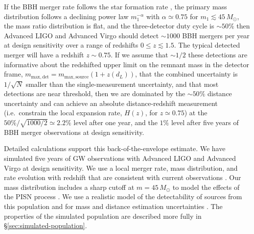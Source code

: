 \documentclass[modern]{aastex62}
\newcommand{\MSourceMax}{45 \, M_\odot}
\begin{document}
If the \ac{BBH} merger rate follows the star formation rate
\citep{Fishbach2018,O1O2Population}, the primary mass distribution follows a
declining power law $m_1^{-\alpha}$ with $\alpha \simeq 0.75$ for $m_1 \lesssim
\MSourceMax{}$, the mass ratio distribution is flat, and the three-detector duty
cycle is $\sim 50\%$ then Advanced LIGO and Advanced Virgo should detect $\sim
1000$ \ac{BBH} mergers per year at design sensitivity over a range of redshifts
$0 \leq z \lesssim 1.5$.  The typical detected merger will have a redshift $z
\sim 0.75$.  If we assume that $\sim 1/2$ these detections are informative about
the redshifted upper limit on the remnant mass in the detector frame,
$m_\mathrm{max,det} = m_\mathrm{max,source} \left(1 + z\left( d_L \right)
\right)$, that the combined uncertainty is $1/\sqrt{N}$ smaller than the
single-measurement uncertainty, and that most detections are near threshold,
then we are dominated by the $\sim 50\%$ distance uncertainty and can achieve an
absolute distance-redshift measurement (i.e.\ constrain the local expansion
rate, $H(z)$, for $z \simeq 0.75$) at the $50 \% / \sqrt{1000/2} \simeq 2.2 \%$
level after one year, and the $1 \%$ level after five years of \ac{BBH} merger
observations at design sensitivity.

Detailed calculations support this back-of-the-envelope estimate.  We have
simulated five years of \ac{GW} observations with Advanced LIGO and Advanced
Virgo at design sensitivity.  We use a local merger rate, mass distribution, and
rate evolution with redshift that are consistent with current observations
\citep{Fishbach2017,Fishbach2018,O1O2Population}.  Our mass distribution
includes a sharp cutoff at $m = \MSourceMax{}$ to model the effects of the
\ac{PISN} process \citep{Belczynski2016}.  We use a realistic model of the
detectability of sources from this population
\citep{GW150914Rate,GW150914RateSupplement} and for mass and distance estimation
uncertainties \citep{Vitale2017}.  The properties of the simulated population
are described more fully in \S \ref{sec:simulated-population}.
\end{document}
